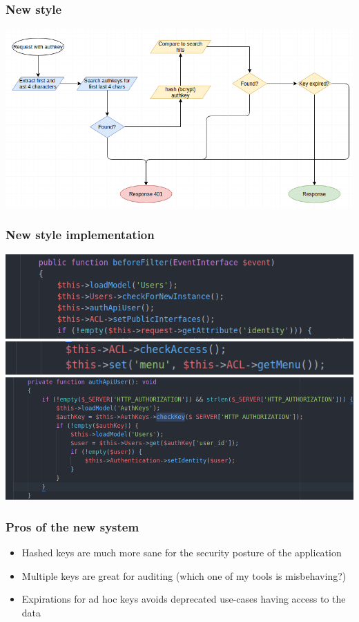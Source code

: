 \begin{frame}
  \frametitle{New style}
  \begin{center}
    \includegraphics[scale=0.5]{advancedAuthkey.png}
  \end{center}
\end{frame}

\begin{frame}
  \frametitle{New style implementation}
    \includegraphics[scale=0.5]{beforefilter.png}
    \includegraphics[scale=0.5]{beforefilter2.png}
    \includegraphics[scale=0.45]{beforefilter3.png}
\end{frame}

\begin{frame}
  \frametitle{Pros of the new system}
  \begin{itemize}
    \item Hashed keys are much more sane for the security posture of the application
    \item Multiple keys are great for auditing (which one of my tools is misbehaving?)
    \item Expirations for ad hoc keys avoids deprecated use-cases having access to the data
  \end{itemize}
\end{frame}

